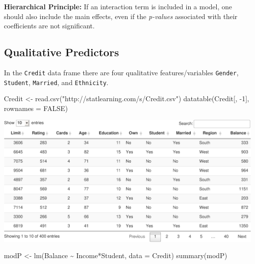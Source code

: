 \documentclass[
]{article}
\newenvironment{Shaded}{\begin{snugshade}}{\end{snugshade}}
\newcommand{\AttributeTok}[1]{\textcolor[rgb]{0.77,0.63,0.00}{#1}}
\newcommand{\ConstantTok}[1]{\textcolor[rgb]{0.00,0.00,0.00}{#1}}
\newcommand{\DecValTok}[1]{\textcolor[rgb]{0.00,0.00,0.81}{#1}}
\newcommand{\FunctionTok}[1]{\textcolor[rgb]{0.00,0.00,0.00}{#1}}
\newcommand{\NormalTok}[1]{#1}
\newcommand{\OtherTok}[1]{\textcolor[rgb]{0.56,0.35,0.01}{#1}}
\newcommand{\SpecialCharTok}[1]{\textcolor[rgb]{0.00,0.00,0.00}{#1}}
\newcommand{\StringTok}[1]{\textcolor[rgb]{0.31,0.60,0.02}{#1}}
\begin{document}
\textbf{Hierarchical Principle:} If an interaction term is included in a model, one should also include the main effects, even if the \emph{p-values} associated with their coefficients are not significant.

\hypertarget{qualitative-predictors}{%
\subsection{Qualitative Predictors}\label{qualitative-predictors}}

In the \texttt{Credit} data frame there are four qualitative features/variables \texttt{Gender}, \texttt{Student}, \texttt{Married}, and \texttt{Ethnicity}.

\begin{Shaded}
\begin{Highlighting}[]
\NormalTok{Credit }\OtherTok{\textless{}{-}} \FunctionTok{read.csv}\NormalTok{(}\StringTok{"http://statlearning.com/s/Credit.csv"}\NormalTok{)}
\FunctionTok{datatable}\NormalTok{(Credit[, }\SpecialCharTok{{-}}\DecValTok{1}\NormalTok{], }\AttributeTok{rownames =} \ConstantTok{FALSE}\NormalTok{)}
\end{Highlighting}
\end{Shaded}

\begin{center}\includegraphics{SDM-CHAP24_files/figure-latex/readin2-1} \end{center}

\begin{Shaded}
\begin{Highlighting}[]
\NormalTok{modP }\OtherTok{\textless{}{-}} \FunctionTok{lm}\NormalTok{(Balance }\SpecialCharTok{\textasciitilde{}}\NormalTok{ Income}\SpecialCharTok{*}\NormalTok{Student, }\AttributeTok{data =}\NormalTok{ Credit)}
\FunctionTok{summary}\NormalTok{(modP)}
\end{Highlighting}
\end{Shaded}
\end{document}
